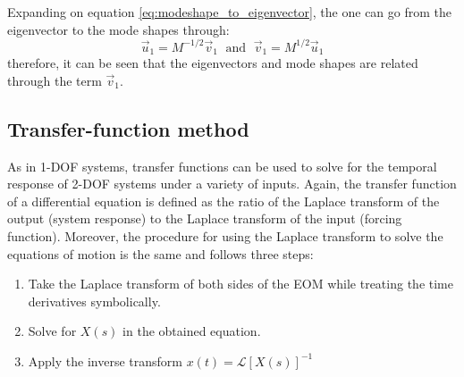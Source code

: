 \documentclass[12pt,letter]{article}
\numberwithin{ex}{section} %
\numberwithin{re}{section} %
\newcommand{\Laplace}[1]{\ensuremath{\mathcal{L}{\left[#1\right]}}}
\begin{document}
Expanding on equation \ref{eq:modeshape_to_eigenvector}, the one can go from the eigenvector to the mode shapes through:
\begin{equation}
\vec{u}_1 = M^{-1/2}\vec{v}_1 \; \text{ and } \; \vec{v}_1 = M^{1/2}\vec{u}_1
\end{equation}
therefore, it can be seen that the eigenvectors and mode shapes are related through the term $\vec{v}_1$. 








\subsection{Transfer-function method}

As in 1-DOF systems, transfer functions can be used to solve for the temporal response of 2-DOF systems under a variety of inputs. Again, the transfer function of a differential equation is defined as the ratio of the Laplace transform of the output (system response) to the Laplace transform of the input (forcing function). Moreover, the procedure for using the Laplace transform to solve the equations of motion is the same and follows three steps:
\begin{enumerate}
	\item Take the Laplace transform of both sides of the EOM while treating the time derivatives symbolically.
	\item Solve for $X(s)$ in the obtained equation.
	\item Apply the inverse transform $x(t) = \Laplace{X(s)}^{-1}$
\end{enumerate}
\end{document}
